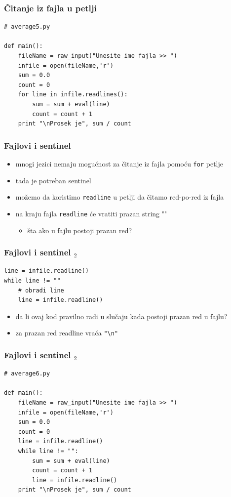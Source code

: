 \documentclass[utf8,compress]{beamer}
\begin{document}
\begin{frame}[fragile]
  \frametitle{Čitanje iz fajla u petlji}
\begin{verbatim}
# average5.py

def main():
    fileName = raw_input("Unesite ime fajla >> ")
    infile = open(fileName,'r')
    sum = 0.0
    count = 0
    for line in infile.readlines():
        sum = sum + eval(line)
        count = count + 1
    print "\nProsek je", sum / count
\end{verbatim}
\end{frame}

\begin{frame}[fragile]
  \frametitle{Fajlovi i sentinel}
  \begin{itemize}
    \item mnogi jezici nemaju mogućnost za čitanje iz fajla pomoću \texttt{for} petlje
    \item tada je potreban sentinel
    \item možemo da koristimo \texttt{readline} u petlji da čitamo red-po-red iz fajla
    \item na kraju fajla \texttt{readline} će vratiti prazan string ""
    \begin{itemize}
      \item šta ako u fajlu postoji prazan red?
    \end{itemize}
  \end{itemize}
\end{frame}

\begin{frame}[fragile]
  \frametitle{Fajlovi i sentinel $_2$}
\begin{verbatim}
line = infile.readline()
while line != ""
    # obradi line
    line = infile.readline()
\end{verbatim}
  \begin{itemize}
    \item da li ovaj kod pravilno radi u slučaju kada postoji prazan red u fajlu?
    \item za prazan red readline vraća \texttt{"\textbackslash n"}
  \end{itemize}
\end{frame}

\begin{frame}[fragile]
  \frametitle{Fajlovi i sentinel $_2$}
\begin{verbatim}
# average6.py

def main():
    fileName = raw_input("Unesite ime fajla >> ")
    infile = open(fileName,'r')
    sum = 0.0
    count = 0
    line = infile.readline()
    while line != "":
        sum = sum + eval(line)
        count = count + 1
        line = infile.readline()
    print "\nProsek je", sum / count
\end{verbatim}
\end{frame}
\end{document}
